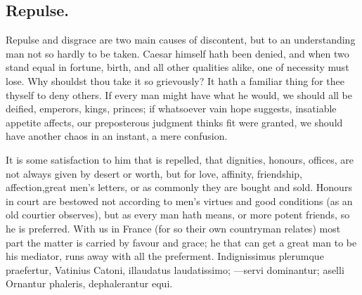 {\subsection{Repulse.}
Repulse and disgrace are two main causes of discontent, but
to an understanding man not so hardly to be taken. Caesar himself hath
been denied, and when two stand equal in fortune, birth, and all
other qualities alike, one of necessity must lose. Why shouldst thou
take it so grievously? It hath a familiar thing for thee thyself to
deny others. If every man might have what he would, we should all be
deified, emperors, kings, princes; if whatsoever vain hope suggests,
insatiable appetite affects, our preposterous judgment thinks fit were
granted, we should have another chaos in an instant, a mere confusion.

It is some satisfaction to him that is repelled, that dignities,
honours, offices, are not always given by desert or worth, but for
love, affinity, friendship, affection,great men's letters, or as
commonly they are bought and sold. Honours in court are bestowed
not according to men's virtues and good conditions (as an old courtier
observes), but as every man hath means, or more potent friends, so he
is preferred. With us in France (for so their own countryman
relates) most part the matter is carried by favour and grace; he that
can get a great man to be his mediator, runs away with all the
preferment. Indignissimus plerumque praefertur, Vatinius Catoni,
illaudatus laudatissimo;
---servi dominantur; aselli
Ornantur phaleris, dephalerantur equi.

}
